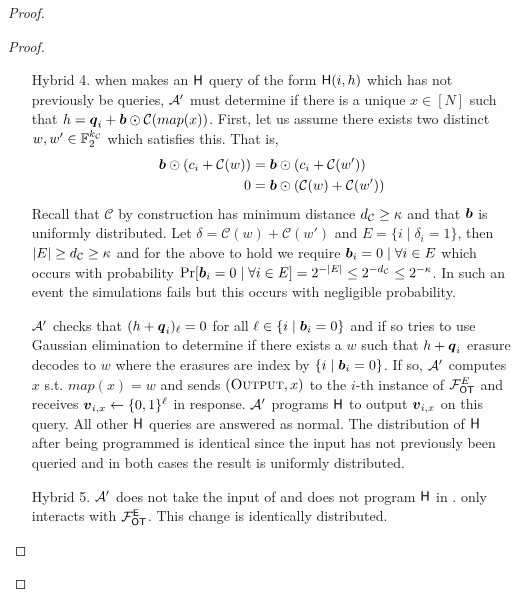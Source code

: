 \begin{proof}
\begin{proof}
\begin{enumerate}[leftmargin=1.8cm]
			
			\item[Hybrid 4.] \label{hybrid:simOutput2} when \send makes an $\mathsf{H}$ query of the form $\mathsf{H}(i,h)$ which has not previously be queries, $\mathcal{A}'$ must determine if there is a unique $x\in[N]$ such that $h=\boldsymbol{q}_i+\boldsymbol{b}\odot \mathcal{C}(map(x))$. First, let us assume there exists two distinct $w,w'\in\mathbb{F}^{{k_\mathcal{C}}}_2$ which satisfies this. That is,
			\begin{align*}
			\boldsymbol{b} \odot (c_i + \mathcal{C}(w)) &= \boldsymbol{b} \odot (c_i + \mathcal{C}(w'))\\
			0 &= \boldsymbol{b} \odot (\mathcal{C}(w) + \mathcal{C}(w'))
			\end{align*}			
			Recall that $\mathcal{C}$ by construction has minimum distance ${d_\mathcal{C}}\geq\kappa$ and that $\boldsymbol{b}$ is uniformly distributed. Let $\delta=\mathcal{C}(w) + \mathcal{C}(w')$ and $E=\{i \mid \delta_i=1\}$, then $|E|\geq {d_\mathcal{C}}\geq \kappa$ and for the above to hold we require $\boldsymbol{b}_i=0 \mid \forall i\in E$ which occurs with probability $\Pr[\boldsymbol{b}_i=0 \mid \forall i\in E]=2^{-|E|}\leq 2^{-{d_\mathcal{C}}}\leq2^{-\kappa}$. In such an event the simulations fails but this occurs with negligible probability.			
			
			$\mathcal{A}'$ checks that $(h+\boldsymbol{q}_i)_\ell =0$ for all $\ell\in \{i \mid \boldsymbol{b}_i=0\}$ and if so tries to use Gaussian elimination to determine if there exists a $w$ such that $h+\boldsymbol{q}_i$ erasure decodes to $w$ where the erasures are index by $\{i \mid \boldsymbol{b}_i=0\}$. If so, $\mathcal{A}'$ computes $x$ s.t. $map(x)=w$ and sends $(\textsc{Output}, x)$ to the $i$-th instance of $\mathcal{F}_{\mathsf{OT}}^E$ and receives $\boldsymbol{v}_{i,x}\gets\{0,1\}^\ell$ in response. $\mathcal{A}'$ programs $\mathsf{H}$ to output $\boldsymbol{v}_{i,x}$ on this query. All other $\mathsf{H}$ queries are answered as normal. The distribution of $\mathsf{H}$ after being programmed is identical since the input has not previously been queried and in both cases the result is uniformly distributed.			
			
			\item[Hybrid 5.] $\mathcal{A}'$ does not take the input of \send and does not program $\mathsf{H}$ in . \send only interacts with $\mathcal{F}_{\mathsf{OT}}^\mathsf{E}$. This change is identically distributed.
		\end{enumerate}
		\pe
	\end{proof}
	\pe
\end{proof}

\iffullversion

